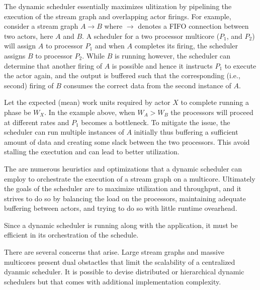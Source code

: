 The dynamic scheduler essentially maximizes ulitization by pipelining
the execution of the stream graph and overlapping actor firings. For
example, consider a stream graph $A\rightarrow B$ where $\rightarrow$
denotes a FIFO connection between two actors, here $A$ and $B$. A
scheduler for a two processor multicore ($P_1$, and $P_2$) will assign
$A$ to processor $P_1$ and when $A$ completes its firing, the
scheduler assigns $B$ to processor $P_2$. While $B$ is running
however, the scheduler can determine that another firing of $A$ is
possible and hence it instructs $P_1$ to execute the actor again, and
the output is buffered such that the corresponding (i.e., second)
firing of $B$ consumes the correct data from the second instance of
$A$.

Let the expected (mean) work units required by actor $X$ to complete
running a phase be $W_X$. In the example above, when $W_A > W_B$
the processors will proceed at different rates and $P_1$ becomes a
bottleneck. To mitigate the issue, the scheduler can run multiple
instances of $A$ initially thus buffering a sufficient amount of data
and creating some slack between the two processors. This avoid
stalling the exectution and can lead to better utilization.

The are numerous heuristics and optimizations that a dynamic scheduler
can employ to orchestrate the execution of a stream graph on a
multicore. Ultimately the goals of the scheduler are to maximize
utilization and throughput, and it strives to do so by balancing the
load on the processors, maintaining adequate buffering between actors,
and trying to do so with little runtime ovearhead.

Since a dynamic scheduler is running along with the application, it
must be efficient in its orchestration of the schedule. 

There are several concerns that arise. Large stream graphs and massive
multicores present dual obstactles that limit the scalability of a
centralized dyanmic scheduler. It is possible to devise distributed or
hierarchical dynamic schedulers but that comes with additional
implementation complexity.

